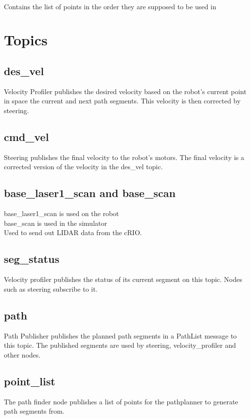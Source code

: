 \\
\indent Contains the list of points in the order they are supposed to be used in\\

\section{Topics}

\subsection{des\_vel}
Velocity Profiler publishes the desired velocity based on the robot's
current point in space the current and next path segments.  This
velocity is then corrected by steering.

\subsection{cmd\_vel}
Steering publishes the final velocity to the robot's motors.  The
final velocity is a corrected version of the velocity in the des\_vel topic.

\subsection{base\_laser1\_scan and base\_scan}
base\_laser1\_scan is used on the robot\\
base\_scan is used in the simulator\\

\noindent Used to send out LIDAR data from the cRIO.

\subsection{seg\_status}
Velocity profiler publishes the status of its current segment on this
topic.  Nodes such as steering subscribe to it.


\subsection{path}
Path Publisher publishes the planned path segments in a PathList message to this topic.  The
published segments are used by steering, velocity\_profiler and other nodes.

\subsection{point\_list}
The path finder node publishes a list of points for the pathplanner to generate path segments from.

